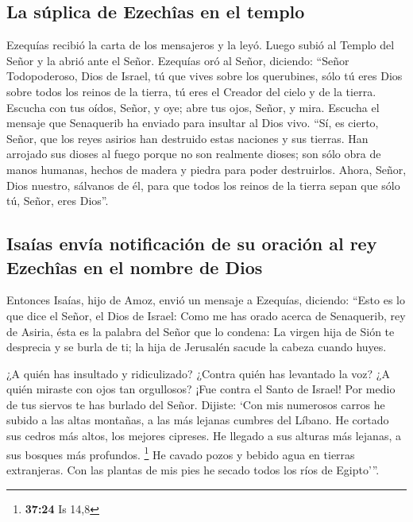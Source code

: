 \hypertarget{la-suxfaplica-de-ezechuxeeas-en-el-templo}{%
\subsection{La súplica de Ezechîas en el
templo}\label{la-suxfaplica-de-ezechuxeeas-en-el-templo}}

 Ezequías recibió la carta de los mensajeros y la leyó.
Luego subió al Templo del Señor y la abrió ante el Señor.
 Ezequías oró al Señor, diciendo:  ``Señor
Todopoderoso, Dios de Israel, tú que vives sobre los querubines, sólo tú
eres Dios sobre todos los reinos de la tierra, tú eres el Creador del
cielo y de la tierra.  Escucha con tus oídos, Señor, y
oye; abre tus ojos, Señor, y mira. Escucha el mensaje que Senaquerib ha
enviado para insultar al Dios vivo.  ``Sí, es cierto,
Señor, que los reyes asirios han destruido estas naciones y sus tierras.
 Han arrojado sus dioses al fuego porque no son realmente
dioses; son sólo obra de manos humanas, hechos de madera y piedra para
poder destruirlos.  Ahora, Señor, Dios nuestro, sálvanos
de él, para que todos los reinos de la tierra sepan que sólo tú, Señor,
eres Dios''.

\hypertarget{isauxedas-envuxeda-notificaciuxf3n-de-su-oraciuxf3n-al-rey-ezechuxeeas-en-el-nombre-de-dios}{%
\subsection{Isaías envía notificación de su oración al rey Ezechîas en
el nombre de
Dios}\label{isauxedas-envuxeda-notificaciuxf3n-de-su-oraciuxf3n-al-rey-ezechuxeeas-en-el-nombre-de-dios}}

 Entonces Isaías, hijo de Amoz, envió un mensaje a
Ezequías, diciendo: ``Esto es lo que dice el Señor, el Dios de Israel:
Como me has orado acerca de Senaquerib, rey de Asiria, 
ésta es la palabra del Señor que lo condena: La virgen hija de Sión te
desprecia y se burla de ti; la hija de Jerusalén sacude la cabeza cuando
huyes.

 ¿A quién has insultado y ridiculizado? ¿Contra quién has
levantado la voz? ¿A quién miraste con ojos tan orgullosos? ¡Fue contra
el Santo de Israel!  Por medio de tus siervos te has
burlado del Señor. Dijiste: `Con mis numerosos carros he subido a las
altas montañas, a las más lejanas cumbres del Líbano. He cortado sus
cedros más altos, los mejores cipreses. He llegado a sus alturas más
lejanas, a sus bosques más profundos. \footnote{\textbf{37:24} Is 14,8}
 He cavado pozos y bebido agua en tierras extranjeras.
Con las plantas de mis pies he secado todos los ríos de Egipto'''.

